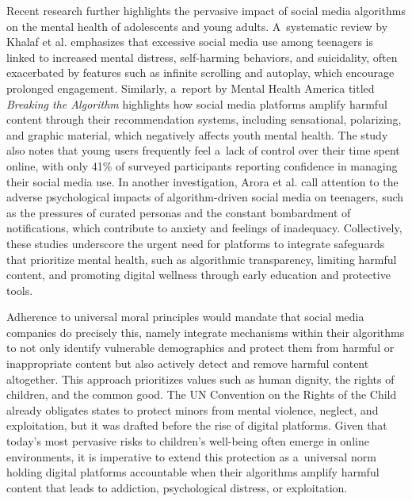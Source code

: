 \documentclass[%
  manuscript=article,
  year=2024,
  volume=77,
  doi=00000.000,
]{zfn}
\begin{document}
Recent research further highlights the pervasive impact of social media algorithms on the mental health of adolescents and young adults. A~systematic review by Khalaf et al. 
\parencite*[][]{khalaf_impact_2023} %
 emphasizes that excessive social media use among teenagers is linked to increased mental distress, self-harming behaviors, and suicidality, often exacerbated by features such as infinite scrolling and autoplay, which encourage prolonged engagement. Similarly, a~report by Mental Health America titled \textit{Breaking the Algorithm} 
\parencite*[][]{adebukola_breaking_2024} %
 highlights how social media platforms amplify harmful content through their recommendation systems, including sensational, polarizing, and graphic material, which negatively affects youth mental health. The study also notes that young users frequently feel a~lack of control over their time spent online, with only 41\% of surveyed participants reporting confidence in managing their social media use. In another investigation, Arora et al. 
\parencite*[][]{arora_pessimism_2024} %
 call attention to the adverse psychological impacts of algorithm-driven social media on teenagers, such as the pressures of curated personas and the constant bombardment of notifications, which contribute to anxiety and feelings of inadequacy. Collectively, these studies underscore the urgent need for platforms to integrate safeguards that prioritize mental health, such as algorithmic transparency, limiting harmful content, and promoting digital wellness through early education and protective tools.



Adherence to universal moral principles would mandate that social media companies do precisely this, namely integrate mechanisms within their algorithms to not only identify vulnerable demographics and protect them from harmful or inappropriate content but also actively detect and remove harmful content altogether. This approach prioritizes values such as human dignity, the rights of children, and the common good. The UN Convention on the Rights of the Child 
\parencite[][]{unicef_convention_1990} %
 already obligates states to protect minors from mental violence, neglect, and exploitation, but it was drafted before the rise of digital platforms. Given that today's most pervasive risks to children's well-being often emerge in online environments, it is imperative to extend this protection as a~universal norm holding digital platforms accountable when their algorithms amplify harmful content that leads to addiction, psychological distress, or exploitation.
\end{document}
